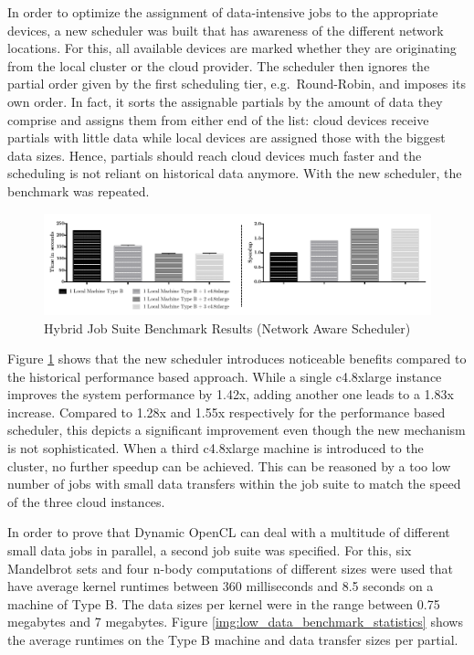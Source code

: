 In order to optimize the assignment of data-intensive jobs to the appropriate devices, a new scheduler was built that has awareness of the different network locations. For this, all available devices are marked whether they are originating from the local cluster or the cloud provider. The scheduler then ignores the partial order given by the first scheduling tier, e.g.~Round-Robin, and imposes its own order. In fact, it sorts the assignable partials by the amount of data they comprise and assigns them from either end of the list: cloud devices receive partials with little data while local devices are assigned those with the biggest data sizes. Hence, partials should reach cloud devices much faster and the scheduling is not reliant on historical data anymore. With the new scheduler, the benchmark was repeated.

\begin{figure}[!htb]
	\includegraphics[width=1.0\textwidth]{images/hybrid_full_benchmark_network_based.pdf}
	\centering
	\caption{Hybrid Job Suite  Benchmark Results (Network Aware Scheduler)}
	\label{img:hybrid_benchmark_results_network_aware}
\end{figure}

Figure \ref{img:hybrid_benchmark_results_network_aware} shows that the new scheduler introduces noticeable benefits compared to the historical performance based approach. While a single c4.8xlarge instance improves the system performance by 1.42x, adding another one leads to a 1.83x increase. Compared to 1.28x and 1.55x respectively for the performance based scheduler, this depicts a significant improvement even though the new mechanism is not sophisticated. When a third c4.8xlarge machine is introduced to the cluster, no further speedup can be achieved. This can be reasoned by a too low number of jobs with small data transfers within the job suite to match the speed of the three cloud instances.

In order to prove that Dynamic OpenCL can deal with a multitude of different small data jobs in parallel, a second job suite was specified. For this, six Mandelbrot sets and four n-body computations of different sizes were used that have average kernel runtimes between 360 milliseconds and 8.5 seconds on a machine of Type B. The data sizes per kernel were in the range between 0.75 megabytes and 7 megabytes. Figure \ref{img:low_data_benchmark_statistics} shows the average runtimes on the Type B machine and data transfer sizes per partial.

